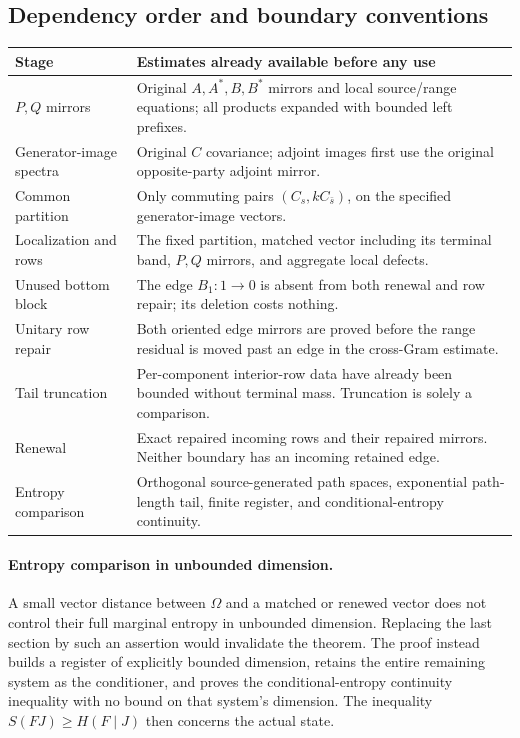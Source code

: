 \subsection{Dependency order and boundary conventions}\label{rnd:sec:ledger}
\begin{center}
\small
\begin{tabular}{p{37mm}p{107mm}}
\toprule
Stage & Estimates already available before any use\\
\midrule
$P,Q$ mirrors & Original $A,A^*,B,B^*$ mirrors and local source/range equations; all products expanded with bounded left prefixes.\\
Generator-image spectra & Original $C$ covariance; adjoint images first use the original opposite-party adjoint mirror.\\
Common partition & Only commuting pairs $(C_s,kC_{\bar s})$, on the specified generator-image vectors.\\
Localization and rows & The fixed partition, matched vector including its terminal band, $P,Q$ mirrors, and aggregate local defects.\\
Unused bottom block & The edge $B_1:1\to0$ is absent from both renewal and row repair; its deletion costs nothing.\\
Unitary row repair & Both oriented edge mirrors are proved before the range residual is moved past an edge in the cross-Gram estimate.\\
Tail truncation & Per-component interior-row data have already been bounded without terminal mass. Truncation is solely a comparison.\\
Renewal & Exact repaired incoming rows and their repaired mirrors. Neither boundary has an incoming retained edge.\\
Entropy comparison & Orthogonal source-generated path spaces, exponential path-length tail, finite register, and conditional-entropy continuity.\\
\bottomrule
\end{tabular}
\end{center}

\paragraph{Entropy comparison in unbounded dimension.}
A small vector distance between $\Omega$ and a matched or renewed vector does not control their full marginal entropy in unbounded dimension. Replacing the last section by such an assertion would invalidate the theorem. The proof instead builds a register of explicitly bounded dimension, retains the entire remaining system as the conditioner, and proves the conditional-entropy continuity inequality with no bound on that system's dimension. The inequality $S(FJ)\ge H(F\mid J)$ then concerns the actual state.

